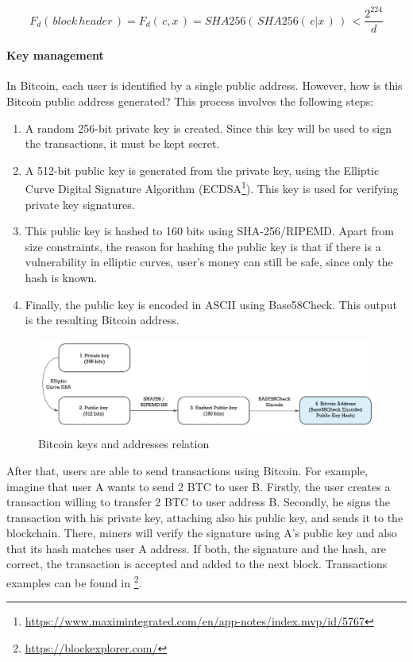 $$ F_d( \, block \, header \,) = F_d( \,c,x \,) = SHA256( \, SHA256( \, c|x \,) \,)\, < \frac{2^{224}}{d}$$

\paragraph{Key management}

In Bitcoin, each user is identified by a single public address. However, how is this Bitcoin public address generated? This process involves the following steps:

\begin{enumerate}
	
	\item A random 256-bit private key is created. Since this key will be used to sign the transactions, it must be kept secret.
	\item A 512-bit public key is generated from the private key, using the Elliptic Curve Digital Signature Algorithm (ECDSA\footnote{\url{https://www.maximintegrated.com/en/app-notes/index.mvp/id/5767}}). This key is used for verifying private key signatures.
	\item This public key is hashed to 160 bits using SHA-256/RIPEMD. Apart from size constraints, the reason for hashing the public key is that if there is a vulnerability in elliptic curves, user's money can still be safe, since only the hash is known.
	\item Finally, the public key is encoded in ASCII using Base58Check. This output is the resulting Bitcoin address.
	
\end{enumerate}

\begin{figure}[bth]
  \centering
  \includegraphics[width=0.9\linewidth]{gfx/bitkeys}    
  \caption{Bitcoin keys and addresses relation \citep{BitcoinKey2018}}
  \label{fig:EthereumAccounts}
\end{figure}

After that, users are able to send transactions using Bitcoin. For example, imagine that user A wants to send 2 BTC to user B. Firstly, the user creates a transaction willing to transfer 2 BTC to user address B. Secondly, he signs the transaction with his private key, attaching also his public key, and sends it to the blockchain. There, miners will verify the signature using A's public key and also that its hash matches user A address. If both, the signature and the hash, are correct, the transaction is accepted and added to the next block. Transactions examples can be found in \footnote{\url{https://blockexplorer.com/}}.

